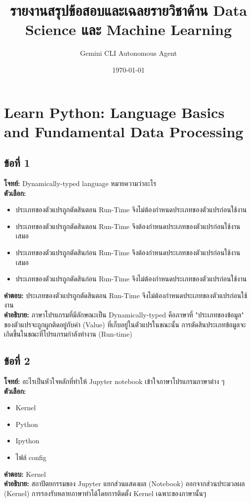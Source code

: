\documentclass[12pt]{article}
\title{รายงานสรุปข้อสอบและเฉลยรายวิชาด้าน Data Science และ Machine Learning}
\author{Gemini CLI Autonomous Agent}
\date{\today}
\begin{document}
\maketitle
\newpage

\section{Learn Python: Language Basics and Fundamental Data Processing}

\subsection*{ข้อที่ 1}
\textbf{โจทย์:} Dynamically-typed language หมายความว่าอะไร\\
\textbf{ตัวเลือก:}
\begin{itemize}
    \item ประเภทของตัวแปรถูกตัดสินตอน Run-Time จึงไม่ต้องกำหนดประเภทของตัวแปรก่อนใช้งาน
    \item ประเภทของตัวแปรถูกตัดสินตอน Run-Time จึงต้องกำหนดประเภทของตัวแปรก่อนใช้งานเสมอ
    \item ประเภทของตัวแปรถูกตัดสินก่อน Run-Time จึงต้องกำหนดประเภทของตัวแปรก่อนใช้งานเสมอ
    \item ประเภทของตัวแปรถูกตัดสินก่อน Run-Time จึงไม่ต้องกำหนดประเภทของตัวแปรก่อนใช้งาน
\end{itemize}

\textbf{คำตอบ:} ประเภทของตัวแปรถูกตัดสินตอน Run-Time จึงไม่ต้องกำหนดประเภทของตัวแปรก่อนใช้งาน\\
\textbf{คำอธิบาย:} ภาษาโปรแกรมที่มีลักษณะเป็น Dynamically-typed คือภาษาที่ "ประเภทของข้อมูล" ของตัวแปรจะถูกผูกติดอยู่กับค่า (Value) ที่เก็บอยู่ในตัวแปรในขณะนั้น การตัดสินประเภทข้อมูลจะเกิดขึ้นในขณะที่โปรแกรมกำลังทำงาน (Run-time)

\subsection*{ข้อที่ 2}
\textbf{โจทย์:} อะไรเป็นหัวใจหลักที่ทำให้ Jupyter notebook เข้าใจภาษาโปรแกรมภาษาต่าง ๆ\\
\textbf{ตัวเลือก:}
\begin{itemize}
    \item Kernel
    \item Python
    \item Ipython
    \item ไฟล์ config
\end{itemize}

\textbf{คำตอบ:} Kernel\\
\textbf{คำอธิบาย:} สถาปัตยกรรมของ Jupyter แยกส่วนแสดงผล (Notebook) ออกจากส่วนประมวลผล (Kernel) การรองรับหลายภาษาทำได้โดยการติดตั้ง Kernel เฉพาะของภาษานั้นๆ
\end{document}
